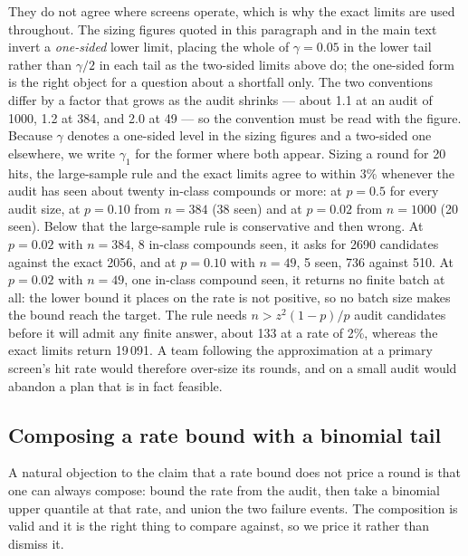 \documentclass[10pt]{article}
\begin{document}
They do not agree where screens operate, which is why the exact limits are used throughout. The sizing figures quoted in this paragraph and in the main text invert a \emph{one-sided} lower limit, placing the whole of $\gamma=0.05$ in the lower tail rather than $\gamma/2$ in each tail as the two-sided limits above do; the one-sided form is the right object for a question about a shortfall only. The two conventions differ by a factor that grows as the audit shrinks --- about 1.1 at an audit of 1000, 1.2 at 384, and 2.0 at 49 --- so the convention must be read with the figure. Because $\gamma$ denotes a one-sided level in the sizing figures and a two-sided one elsewhere, we write $\gamma_1$ for the former where both appear. Sizing a round for 20 hits, the large-sample rule and the exact limits agree to within 3\% whenever the audit has seen about twenty in-class compounds or more: at $p=0.5$ for every audit size, at $p=0.10$ from $n=384$ (38 seen) and at $p=0.02$ from $n=1000$ (20 seen). Below that the large-sample rule is conservative and then wrong. At $p=0.02$ with $n=384$, 8 in-class compounds seen, it asks for 2690 candidates against the exact 2056, and at $p=0.10$ with $n=49$, 5 seen, 736 against 510. At $p=0.02$ with $n=49$, one in-class compound seen, it returns no finite batch at all: the lower bound it places on the rate is not positive, so no batch size makes the bound reach the target. The rule needs $n>z^2(1-p)/p$ audit candidates before it will admit any finite answer, about 133 at a rate of 2\%, whereas the exact limits return 19\,091. A team following the approximation at a primary screen's hit rate would therefore over-size its rounds, and on a small audit would abandon a plan that is in fact feasible.

\subsection{Composing a rate bound with a binomial tail}
\label{sec:compose}

A natural objection to the claim that a rate bound does not price a round is that one can
always compose: bound the rate from the audit, then take a binomial upper quantile at that
rate, and union the two failure events. The composition is valid and it is the right thing to
compare against, so we price it rather than dismiss it.
\end{document}
